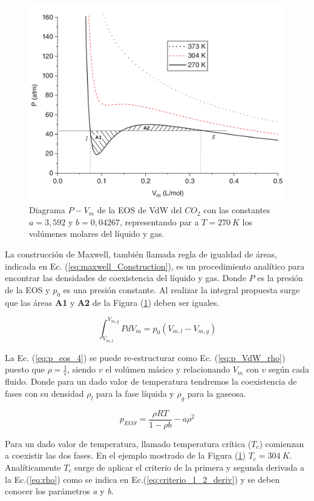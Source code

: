 \begin{figure}[htbp]
	\centering
	\includegraphics[width=.8\textwidth]{figs/cap4/Diagrama_P_V_del_CO2_Multiphase_LBM}
	\caption{Diagrama $P - V_m$ de la EOS de VdW del $CO_2$ con las constantes $a = 3,592$ y $b = 0,04267$, representando par a $T = 270 \> K$ los volúmenes molares del líquido y gas. \cite{huang2015multiphase}}
	\label{fig:P_V_CO2}	
\end{figure}

La construcción de Maxwell, también llamada regla de igualdad de áreas, indicada en Ec. (\ref{eq:maxwell_Construction}), es un procedimiento analítico para encontrar las densidades de coexistencia del líquido y gas. Donde $P$ es la presión de la EOS y $p_0$ es una presión constante. Al realizar la integral propuesta surge que las áreas \textbf{A1} y \textbf{A2} de la Figura (\ref{fig:P_V_CO2}) deben ser iguales.

\begin{equation}
\int_{V_{m,l}}^{V_{m,g}} P d V_m = p_0 (V_{m,l} -  V_{m,g})
\label{eq:maxwell_Construction}
\end{equation}

La Ec. (\ref{eq:p_eos_4}) se puede re-estructurar como Ec. (\ref{eq:p_VdW_rho}) puesto que $\rho = \frac{1}{v}$, siendo $v$ el volúmen másico y relacionando $V_m$ con $v$ según cada fluido. Donde para un dado valor de temperatura tendremos la coexistencia de fases con su densidad $\rho_l$ para la fase líquida y $\rho_g$ para la gaseosa.

\begin{equation}
	p_{EOS} = \frac{\rho R T}{1- \rho b} - a {\rho}^{2} 
	\label{eq:p_VdW_rho}
\end{equation}

Para un dado valor de temperatura, llamado temperatura crítica (\textit{$T_c$}) comienzan a coexistir las dos fases. En el ejemplo mostrado de la Figura (\ref{fig:P_V_CO2}) $T_c = 304 \> K$. Analíticamente $T_c$ surge de aplicar el criterio de la primera y segunda derivada a la Ec.(\ref{eq:rho}) como se indica en Ec.(\ref{eq:criterio_1_2_deriv}) y se deben conocer los parámetros \textit{a} y \textit{b}.

